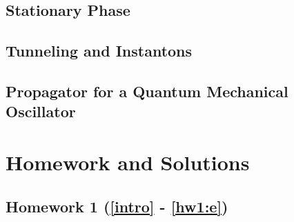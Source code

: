 \documentclass[a4paper]{article}
\begin{document}
\subsection{Stationary Phase}
\subsection{Tunneling and Instantons}
\subsection{Propagator for a Quantum Mechanical Oscillator}

\section{Homework and Solutions}
\subsection{Homework 1 (\ref{intro} - \ref{hw1:e})}
\end{document}
